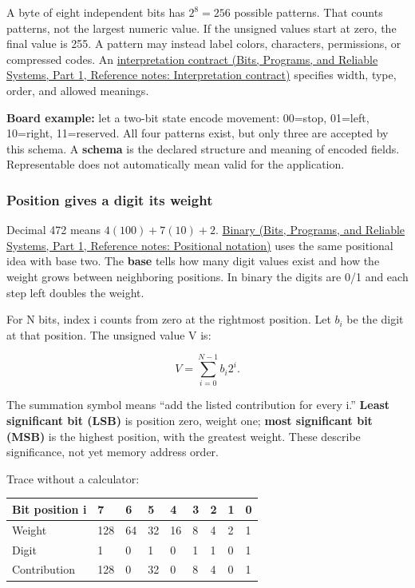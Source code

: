 A byte of eight independent bits has \(2^8=256\) possible patterns. That counts patterns, not the largest numeric value. If the unsigned values start at zero, the final value is 255. A pattern may instead label colors, characters, permissions, or compressed codes. An \href{../01-Bits-Programs-and-Reliable-Systems-P01/main.pdf\#appendix-f414bd4ed05c}{interpretation contract (Bits, Programs, and Reliable Systems, Part 1, Reference notes: Interpretation contract)} specifies width, type, order, and allowed meanings.

\textbf{Board example:} let a two-bit state encode movement: 00=stop, 01=left, 10=right, 11=reserved. All four patterns exist, but only three are accepted by this schema. A \textbf{schema} is the declared structure and meaning of encoded fields. Representable does not automatically mean valid for the application.

\subsubsection{Position gives a digit its weight}\label{05-engine-i-ch001-position-gives-a-digit-its-weight}

\hypertarget{05-engine-i-ch001-position-gives-a-digit-its-weight}{}

Decimal 472 means \(4(100)+7(10)+2\). \href{../01-Bits-Programs-and-Reliable-Systems-P01/main.pdf\#appendix-83c3f28f7bda}{Binary (Bits, Programs, and Reliable Systems, Part 1, Reference notes: Positional notation)} uses the same positional idea with base two. The \textbf{base} tells how many digit values exist and how the weight grows between neighboring positions. In binary the digits are 0/1 and each step left doubles the weight.

For N bits, index i counts from zero at the rightmost position. Let \(b_i\) be the digit at that position. The unsigned value V is:

\[
V=\sum_{i=0}^{N-1}b_i2^i.
\]

The summation symbol means ``add the listed contribution for every i.'' \textbf{Least significant bit (LSB)} is position zero, weight one; \textbf{most significant bit (MSB)} is the highest position, with the greatest weight. These describe significance, not yet memory address order.

Trace  without a calculator:

{\def\LTcaptype{none} %
\begin{longtable}[]{@{}lllllllll@{}}
\toprule\noalign{}
Bit position i & 7 & 6 & 5 & 4 & 3 & 2 & 1 & 0 \\
\midrule\noalign{}
\endhead
\bottomrule\noalign{}
\endlastfoot
Weight & 128 & 64 & 32 & 16 & 8 & 4 & 2 & 1 \\
Digit & 1 & 0 & 1 & 0 & 1 & 1 & 0 & 1 \\
Contribution & 128 & 0 & 32 & 0 & 8 & 4 & 0 & 1 \\
\end{longtable}
}

